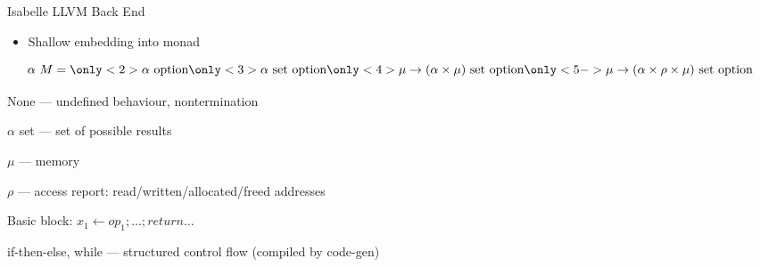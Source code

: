 \documentclass[fleqn]{beamer}
\begin{document}
\begin{frame}[fragile]{Isabelle LLVM Back End}
  \begin{itemize}
   \item<+-> Shallow embedding into monad 

  \end{itemize}
  \[\alpha~M =
    \only<2>{\alpha\textrm{ option}}
    \only<3>{\alpha \textrm{ set option}}
    \only<4>{\mu \to (\alpha\times\mu) \textrm{ set option} }
    \only<5->{\mu \to (\alpha\times\rho\times\mu) \textrm{ set option} }
  \]

   None --- undefined behaviour, nontermination

   $\alpha$ set --- set of possible results

   $\mu$ --- memory

   $\rho$ --- access report: read/written/allocated/freed addresses


  \hfill

  Basic block: $x_1 \leftarrow op_1; \ldots; return \ldots$


  if-then-else, while --- structured control flow (compiled by code-gen)

\end{frame}
\end{document}
